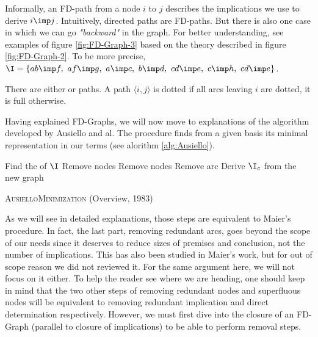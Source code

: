 \noindent Informally, an FD-path from a node $i$ to $j$ describes the 
implications we use to derive $i \imp j$. Intuitively, 
directed paths are FD-paths. But there is also one case in which
we can go \textit{"backward"} in the graph. For better understanding, see examples of figure \ref{fig:FD-Graph-3} based on the theory described in figure 
\ref{fig:FD-Graph-2}. To be more precise, $\I = \{ ab \imp f, \ af \imp g,
\ a \imp c, \ b \imp d, \ cd \imp e, \ c \imp h, \ cd \imp e \}$.

\begin{figure}[ht]
	
\end{figure}

There are either  or  paths. A path $\langle i, j
\rangle$ is dotted if all arcs leaving $i$ are dotted, it is full otherwise.

\begin{figure}[ht]
	
\end{figure}

\vspace{1.2em}

Having explained FD-Graphs, we will now move to explanations of the algorithm
developed by Ausiello and al. The procedure finds from a given basis 
its minimal representation in our terms (see alorithm \ref{alg:Ausiello}).

\vspace{1.2em}

\begin{algorithm}[H]
	
	\BlankLine
	\BlankLine
	
	Find the  of $\I$ \;
	Remove  nodes \;
	Remove  nodes \;
	Remove  arc \;
	Derive $\I_c$ from the new graph \;
	
	\caption{\textsc{AusielloMinimization} (Overview, 1983)}
	\label{alg:Ausiello}
\end{algorithm}

\vspace{1.2em}

As we will see in detailed explanations, those steps are equivalent to Maier's
procedure. In fact, the last part, removing redundant arcs, goes beyond the 
scope of our needs since it deserves to reduce sizes of premises and 
conclusion, not the number of implications. This has also been studied in 
Maier's work, but for out of scope reason we did not reviewed it. For the same
argument here, we will not focus on it either. To help the reader see where we 
are heading, one should keep in mind that the two other steps of removing 
redundant nodes and superfluous nodes will be equivalent to removing redundant 
implication and direct determination respectively. However, we must first
dive into the closure of an FD-Graph (parallel to closure of implications) to
be able to perform removal steps.

